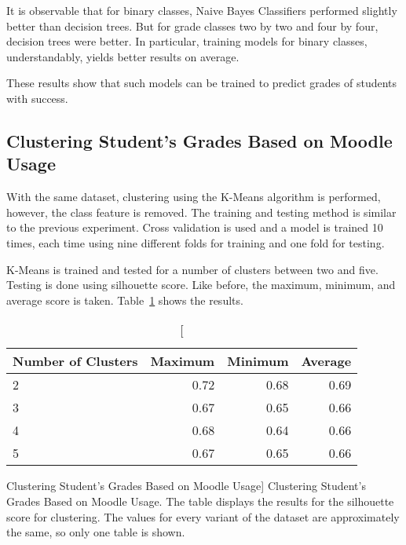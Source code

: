 It is observable that for binary classes, Naive Bayes Classifiers performed
slightly better than decision trees. But for grade classes two by two and four
by four, decision trees were better. In particular, training models for binary
classes, understandably, yields better results on average.

These results show that such models can be trained to predict grades of
students with success.

\subsection{Clustering Student's Grades Based on Moodle Usage}
\label{sec:exp_002}

With the same dataset, clustering using the K-Means algorithm is performed,
however, the class feature is removed. The training and testing method is
similar to the previous experiment. Cross validation is used and a model is
trained 10 times, each time using nine different folds for training and one
fold for testing.

K-Means is trained and tested for a number of clusters between two and five.
Testing is done using silhouette score. Like before, the maximum, minimum, and
average score is taken. Table~\ref{tab:exp_002_res} shows the results.

\begin{table}[h!]
    \centering

    \begin{tabular}{| l | r | r | r |}
        \hline
        \textbf{Number of Clusters} & \textbf{Maximum} & \textbf{Minimum} & \textbf{Average} \\ \hline
        2 & 0.72 & 0.68 & 0.69 \\ \hline
        3 & 0.67 & 0.65 & 0.66 \\ \hline
        4 & 0.68 & 0.64 & 0.66 \\ \hline
        5 & 0.67 & 0.65 & 0.66 \\ \hline
    \end{tabular}

    \caption
        [Clustering Student's Grades Based on Moodle Usage]
        {Clustering Student's Grades Based on Moodle Usage. The table displays
        the results for the silhouette score for clustering. The values for
        every variant of the dataset are approximately the same, so only one
        table is shown.}

    \label{tab:exp_002_res}
\end{table}

